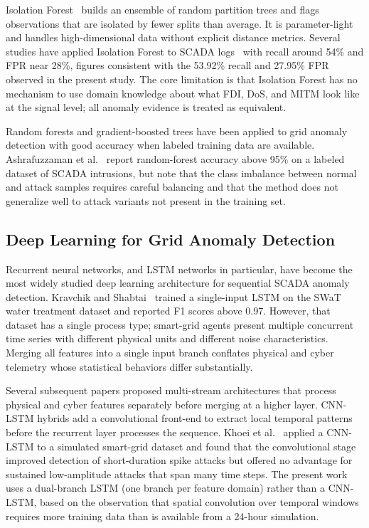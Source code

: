 Isolation Forest~\cite{liu2008isolation} builds an ensemble of random partition trees and flags
observations that are isolated by fewer splits than average. It is parameter-light and handles
high-dimensional data without explicit distance metrics. Several studies have applied Isolation
Forest to SCADA logs~\cite{beaver2013evaluation} with recall around 54\% and FPR near 28\%, figures
consistent with the 53.92\% recall and 27.95\% FPR observed in the present study. The core
limitation is that Isolation Forest has no mechanism to use domain knowledge about what FDI, DoS,
and MITM look like at the signal level; all anomaly evidence is treated as equivalent.

Random forests and gradient-boosted trees have been applied to grid anomaly detection with good
accuracy when labeled training data are available. Ashrafuzzaman et al.~\cite{ashrafuzzaman2020}
report random-forest accuracy above 95\% on a labeled dataset of SCADA intrusions, but note that
the class imbalance between normal and attack samples requires careful balancing and that the method
does not generalize well to attack variants not present in the training set.

\subsection{Deep Learning for Grid Anomaly Detection}

Recurrent neural networks, and LSTM networks in particular, have become the most widely studied
deep learning architecture for sequential SCADA anomaly detection. Kravchik and Shabtai~\cite{kravchik2018}
trained a single-input LSTM on the SWaT water treatment dataset and
reported F1 scores above 0.97. However, that dataset has a single process type; smart-grid agents
present multiple concurrent time series with different physical units and different noise
characteristics. Merging all features into a single input branch conflates physical and cyber
telemetry whose statistical behaviors differ substantially.

Several subsequent papers proposed multi-stream architectures that process physical and cyber
features separately before merging at a higher layer. CNN-LSTM hybrids add a convolutional front-end
to extract local temporal patterns before the recurrent layer processes the sequence. Khoei
et al.~\cite{khoei2021} applied a CNN-LSTM to a simulated smart-grid dataset and found that the
convolutional stage improved detection of short-duration spike attacks but offered no advantage for
sustained low-amplitude attacks that span many time steps. The present work uses a dual-branch LSTM
(one branch per feature domain) rather than a CNN-LSTM, based on the observation that spatial
convolution over temporal windows requires more training data than is available from a 24-hour
simulation.

